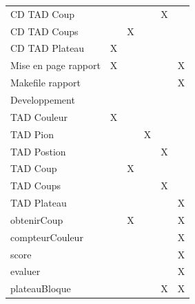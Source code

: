 \documentclass{article}
\begin{document}
\begin{tabular}{|l|c|c|c|c|c|}
  CD TAD Coup & & & & X & \\                                                                                                                                                                             
  CD TAD Coups & & X & & & \\                                                                                                                                                                            
  CD TAD Plateau & X & & & & \\                              
  Mise en page rapport & X & & & & X \\      
  Makefile rapport & & & & & X \\
  \hline
  Developpement \\
  \hline
  TAD Couleur & X & & & & \\                                                                                                                                                                       
  TAD Pion & & & X & & \\                                                                                                                                                                              
  TAD Postion & & & & X &  \\                                                                                                                                                                          
  TAD Coup & & X & &  & \\                                                                                                                                                                              
  TAD Coups & & & & X & \\                                                                                                                                                                             
  TAD Plateau & & & & & X \\                                                                                                                                                                      
  obtenirCoup & & X & & & X \\
  compteurCouleur & & & & & X \\
  score & & & & & X \\
  evaluer & & & & & X \\
  plateauBloque & & & & X & X \\

\end{tabular}
\end{document}
